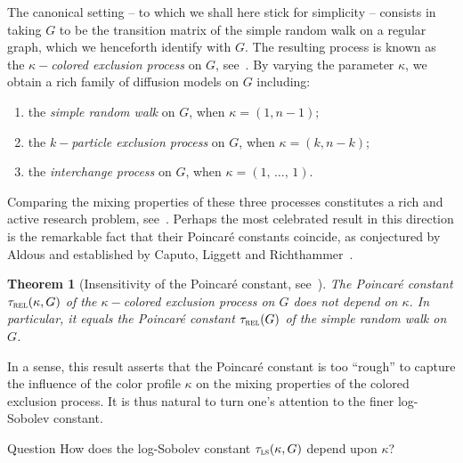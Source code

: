 \documentclass[10pt]{amsart}
\newtheorem{theo}{Theorem}[section]
\theoremstyle{definition}\newtheorem{defi}[theo]{Definition}\newtheorem{rema}[theo]{Remark}\newtheorem{exam}[theo]{Example}\newtheorem{exem}[theo]{Example}\newtheorem{nota}[theo]{Notation}
\newcommand{\trel}{\tau_{\textsc{rel}}}
\newcommand{\tls}{\tau_{\textsc{ls}}}
\begin{document}
The canonical setting -- to which we shall here stick for simplicity -- consists in taking $G$ to be the transition matrix of the simple random walk on a regular graph, which we henceforth identify with $G$. The resulting process is known as the $\kappa-$\emph{colored exclusion process} on $G$, see~\cite{MR2629990}. By varying the parameter $\kappa$, we obtain a rich family of diffusion models on $G$ including:
\begin{enumerate}
\item the \emph{simple random walk} on $G$, when $\kappa=(1,n-1)$;
\item the \emph{$k-$particle exclusion process} on $G$, when $\kappa=(k,n-k)$;
\item the \emph{interchange process} on $G$, when $\kappa=(1,\,\ldots,\,1)$.
\end{enumerate}

Comparing the mixing properties of these three processes constitutes a rich and active research problem, see~\cite{2018arXiv181110537A,MR2629990,MR3978223,hermon2018exclusion, MR3069380,MR2244427,MR3077529, MR2023023}. Perhaps the most celebrated result in this direction is the remarkable fact that their Poincaré constants coincide, as conjectured by Aldous and established by Caputo, Liggett and Richthammer~\cite{MR2629990}.

\begin{theo}[Insensitivity of the Poincaré constant, see~\cite{MR2629990}]\label{th:aldous}
The Poincaré constant $\trel(\kappa,G)$ of the $\kappa-$colored exclusion process on $G$ does not depend on $\kappa$. In particular, it equals the Poincaré constant $\trel(G)$ of the simple random walk on $G$.
\end{theo}

In a sense, this result asserts that the Poincaré constant is too ``rough'' to capture the influence of the color profile $\kappa$ on the mixing properties of the colored exclusion process. It is thus natural to turn one's attention to the finer log-Sobolev constant.

\begin{enonce}[remark]{Question}
How does the log-Sobolev constant $\tls(\kappa,G)$ depend upon $\kappa$?
\end{enonce}
\end{document}
